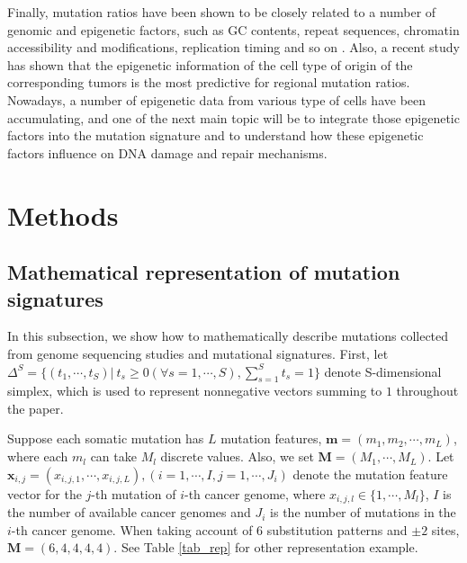 Finally, mutation ratios have been shown to be closely related to a number of genomic and epigenetic factors,
such as GC contents, repeat sequences, chromatin accessibility and modifications, replication timing and so on \cite{pmid22820252, pmid21953857, pmid23422670, pmid23770567}.
Also, a recent study has shown that the epigenetic information of the cell type of origin of the corresponding tumors is the most predictive \cite{pmid25693567} for regional mutation ratios.
Nowadays, a number of epigenetic data from various type of cells have been accumulating,
and one of the next main topic will be to integrate those epigenetic factors into the mutation signature 
and to understand how these epigenetic factors influence on DNA damage and repair mechanisms.




\section*{Methods}


\subsection*{Mathematical representation of mutation signatures} 

In this subsection, 
we show how to mathematically describe mutations collected from genome sequencing studies and mutational signatures.
First, let $\Delta^S = \{ (t_1, \cdots, t_S) |\ t_s \geq 0 (\forall s = 1, \cdots, S), \sum_{s=1}^S t_s = 1 \}$ denote S-dimensional simplex,
which is used to represent nonnegative vectors summing to $1$ throughout the paper.

Suppose each somatic mutation has $L$ mutation features, $\bm{m} = (m_1, m_2, \cdots, m_L)$, 
where each $m_l$ can take $M_l$ discrete values. Also, we set $\bm{M} = (M_1, \cdots, M_L)$.
Let $\bm{x}_{i, j} = (x_{i, j, 1}, \cdots, x_{i, j, L}), (i = 1, \cdots, I, j = 1, \cdots, J_i)$ denote the mutation feature vector for the $j$-th mutation of $i$-th cancer genome,
where $x_{i, j, l} \in \{1, \cdots, M_l \}$, $I$ is the number of available cancer genomes and $J_i$ is the number of mutations in the $i$-th cancer genome.
When taking account of 6 substitution patterns and $\pm 2$ sites,
$\bm{M} = (6, 4, 4, 4, 4)$.
See Table \ref{tab_rep} for other representation example.

